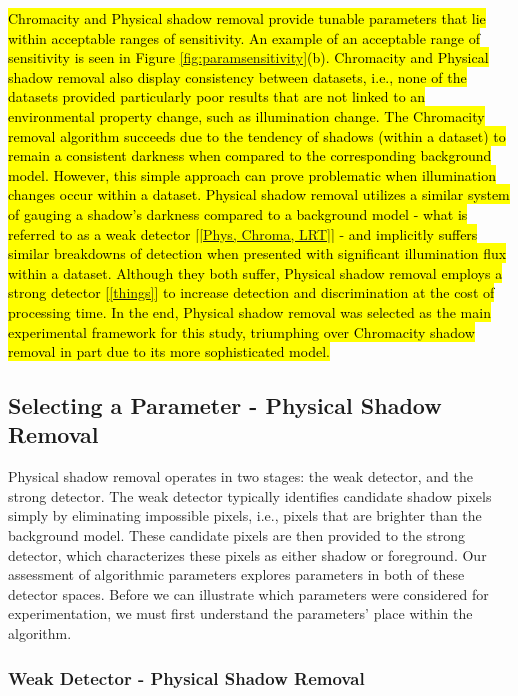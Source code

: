 \documentclass[12pt]{report}
\begin{document}
\hl{Chromacity and Physical shadow removal provide tunable parameters that lie within acceptable ranges of sensitivity. An example of an acceptable range of sensitivity is seen in Figure \ref{fig:paramsensitivity}(b). Chromacity and Physical shadow removal also display consistency between datasets, i.e., none of the datasets provided particularly poor results that are not linked to an environmental property change, such as illumination change. The Chromacity removal algorithm succeeds due to the tendency of shadows (within a dataset) to remain a consistent darkness when compared to the corresponding background model. However, this simple approach can prove problematic when illumination changes occur within a dataset. Physical shadow removal utilizes a similar system of gauging a shadow's darkness compared to a background model - what is referred to as a weak detector [\ref{Phys, Chroma, LRT}] - and implicitly suffers similar breakdowns of detection when presented with significant illumination flux within a dataset. Although they both suffer, Physical shadow removal employs a strong detector [\ref{things}] to increase detection and discrimination at the cost of processing time. In the end, Physical shadow removal was selected as the main experimental framework for this study, triumphing over Chromacity shadow removal in part due to its more sophisticated model.}

\subsection{Selecting a Parameter - Physical Shadow Removal} \label{section:selectparameter}

Physical shadow removal operates in two stages: the weak detector, and the strong detector. The weak detector typically identifies candidate shadow pixels simply by eliminating impossible pixels, i.e., pixels that are brighter than the background model. These candidate pixels are then provided to the strong detector, which characterizes these pixels as either shadow or foreground. Our assessment of algorithmic parameters explores parameters in both of these detector spaces. Before we can illustrate which parameters were considered for experimentation, we must first understand the parameters' place within the algorithm.

\subsubsection{Weak Detector - Physical Shadow Removal}
\end{document}
